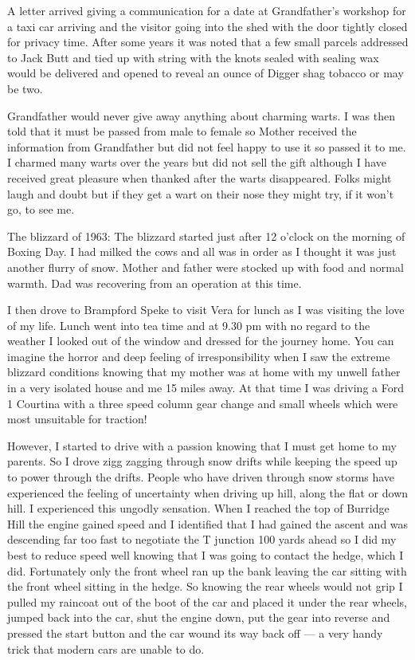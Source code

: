 A letter arrived giving a communication for a date at Grandfather's workshop for
a taxi car arriving and the visitor going into the shed with the door tightly
closed for privacy time. After some years it was noted that a few small
parcels addressed to Jack Butt and tied up with string with the knots sealed
with sealing wax would be delivered and opened to reveal an ounce of Digger
shag tobacco or may be two.

Grandfather would never give away anything about charming warts. I was then
told that it must be passed from male to female so Mother received the
information from Grandfather but did not feel happy to use it so passed it to
me. I charmed many warts over the years but did not sell the gift although I
have received great pleasure when thanked after the warts disappeared. Folks
might laugh and doubt but if they get a wart on their nose they might try, if
it won't go, to see me.

The blizzard of 1963: The blizzard started just after 12 o'clock on the morning
of Boxing Day. I had milked the cows and all was in order as I thought it was
just another flurry of snow. Mother and father were stocked up with food and
normal warmth. Dad was recovering from an operation at this time.

I then drove to Brampford Speke to visit Vera for lunch as I was visiting the
love of my life. Lunch went into tea time and at 9.30 pm with no regard to the
weather I looked out of the window and dressed for the journey home. You can
imagine the horror and deep feeling of irresponsibility when I saw the extreme
blizzard conditions knowing that my mother was at home with my unwell father in
a very isolated house and me 15 miles away. At that time I was driving a Ford
1 Courtina with a three speed column gear change and small wheels which were
most unsuitable for traction!

However, I started to drive with a passion knowing that I must get home to my
parents. So I drove zigg zagging through snow drifts while keeping the speed
up to power through the drifts. People who have driven through snow storms have
experienced the feeling of uncertainty when driving up hill, along the flat or
down hill. I experienced this ungodly sensation. When I reached the top of
Burridge Hill the engine gained speed and I identified that I had gained the
ascent and was descending far too fast to negotiate the T junction 100 yards
ahead so I did my best to reduce speed well knowing that I was going to contact
the hedge, which I did. Fortunately only the front wheel ran up the bank
leaving the car sitting with the front wheel sitting in the hedge. So knowing
the rear wheels would not grip I pulled my raincoat out of the boot of the car
and placed it under the rear wheels, jumped back into the car, shut the engine
down, put the gear into reverse and pressed the start button and the car wound
its way back off --- a very handy trick that modern cars are unable to do.

